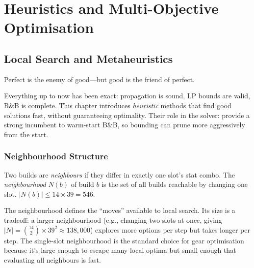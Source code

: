 \documentclass[11pt, a4paper, oneside]{book}
\begin{document}
\part{Heuristics and Multi-Objective Optimisation}

\chapter{Local Search and Metaheuristics}
\label{ch:heuristics}

\epigraph{Perfect is the enemy of good---but good is the friend of perfect.}{}

Everything up to now has been exact: propagation is sound, LP bounds are
valid, B\&B is complete.  This chapter introduces \emph{heuristic} methods
that find good solutions fast, without guaranteeing optimality.  Their role
in the solver: provide a strong incumbent to warm-start B\&B, so bounding
can prune more aggressively from the start.

\section{Neighbourhood Structure}

\begin{defbox}[title={Neighbourhood for Gear Builds}]
Two builds are \emph{neighbours} if they differ in exactly one slot's stat
combo.  The \emph{neighbourhood} $N(b)$ of build $b$ is the set of all
builds reachable by changing one slot.  $|N(b)| \leq 14 \times 39 = 546$.
\end{defbox}

The neighbourhood defines the ``moves'' available to local search.  Its
size is a tradeoff: a larger neighbourhood (e.g., changing two slots at once,
giving $|N| = \binom{14}{2} \times 39^2 \approx 138{,}000$) explores more
options per step but takes longer per step.  The single-slot neighbourhood
is the standard choice for gear optimisation because it's large enough to
escape many local optima but small enough that evaluating all neighbours is
fast.
\end{document}
